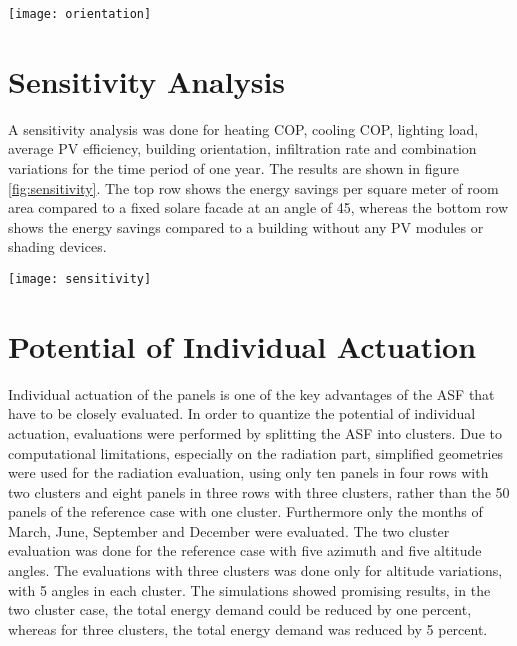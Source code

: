 	\begin{figure*}
	\begin{center}
	\texttt{[image: orientation]}
	\caption{Energy demand in dependence of building orientation. South facing facades perform best.}
	\label{fig:buildingOrientation}
	\end{center}
	\end{figure*}

\section{Sensitivity Analysis}

	A sensitivity analysis was done for heating COP, cooling COP, lighting load, average PV efficiency, building orientation, infiltration rate and combination variations for the time period of one year. The results are shown in figure \ref{fig:sensitivity}. The top row shows the energy savings per square meter of room area compared to a fixed solare facade at an angle of 45\degree, whereas the bottom row shows the energy savings compared to a building without any PV modules or shading devices. 

	\begin{figure*}
	\begin{center}
	\texttt{[image: sensitivity]}
	\caption{Sensitivity analysis of energy savings during one year. From left to right, sensitivities on heating COP, cooling COP, lighting load, average PV efficiency, building orientation, combination variations and infiltration rate. Top row shows the energy savings compared to a fixed solar facade at a 45\degree altitude angle, the bottom row shows the energy savings compared to a room without shading or PV modules.}
	\label{fig:sensitivity}
	\end{center}
	\end{figure*}

\section{Potential of Individual Actuation}
	Individual actuation of the panels is one of the key advantages of the ASF that have to be closely evaluated. In order to quantize the potential of individual actuation, evaluations were performed by splitting the ASF into clusters. Due to computational limitations, especially on the radiation part, simplified geometries were used for the radiation evaluation, using only ten panels in four rows with two clusters and eight panels in three rows with three clusters, rather than the 50 panels of the reference case with one cluster. Furthermore only the months of March, June, September and December were evaluated. The two cluster evaluation was done for the reference case with five azimuth and five altitude angles. The evaluations with three clusters was done only for altitude variations, with 5 angles in each cluster. The simulations showed promising results, in the two cluster case, the total energy demand could be reduced by one percent, whereas for three clusters, the total energy demand was reduced by 5 percent. 